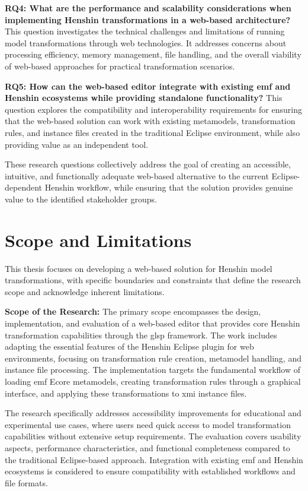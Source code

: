 \textbf{RQ4: What are the performance and scalability considerations when implementing Henshin transformations in a web-based architecture?}
This question investigates the technical challenges and limitations of running model transformations through web technologies. It addresses concerns about processing efficiency, memory management, file handling, and the overall viability of web-based approaches for practical transformation scenarios.

\textbf{RQ5: How can the web-based editor integrate with existing \ac{emf} and Henshin ecosystems while providing standalone functionality?}
This question explores the compatibility and interoperability requirements for ensuring that the web-based solution can work with existing metamodels, transformation rules, and instance files created in the traditional Eclipse environment, while also providing value as an independent tool.

These research questions collectively address the goal of creating an accessible, intuitive, and functionally adequate web-based alternative to the current Eclipse-dependent Henshin workflow, while ensuring that the solution provides genuine value to the identified stakeholder groups.

\section{Scope and Limitations}
\label{subsec:scope-limitations}

This thesis focuses on developing a web-based solution for Henshin model transformations, with specific boundaries and constraints that define the research scope and acknowledge inherent limitations.

\textbf{Scope of the Research:}
The primary scope encompasses the design, implementation, and evaluation of a web-based editor that provides core Henshin transformation capabilities through the \ac{glsp} framework. The work includes adapting the essential features of the Henshin Eclipse plugin for web environments, focusing on transformation rule creation, metamodel handling, and instance file processing. The implementation targets the fundamental workflow of loading \ac{emf} Ecore metamodels, creating transformation rules through a graphical interface, and applying these transformations to \ac{xmi} instance files.

The research specifically addresses accessibility improvements for educational and experimental use cases, where users need quick access to model transformation capabilities without extensive setup requirements. The evaluation covers usability aspects, performance characteristics, and functional completeness compared to the traditional Eclipse-based approach. Integration with existing \ac{emf} and Henshin ecosystems is considered to ensure compatibility with established workflows and file formats.

